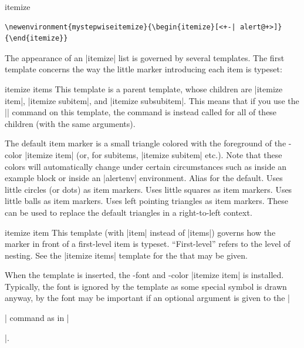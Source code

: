 \begin{environment}{{itemize}}
  \example
\begin{verbatim}
\newenvironment{mystepwiseitemize}{\begin{itemize}[<+-| alert@+>]}{\end{itemize}}
\end{verbatim}

  The appearance of an |itemize| list is governed by several templates. The first template concerns the way the little marker introducing each item is typeset:
  \begin{element}{itemize items}\semiyes\no\no
    This template is a parent template, whose children are |itemize item|, |itemize subitem|, and |itemize subsubitem|. This means that if you use the |\setbeamertemplate| command on this template, the command is instead called for all of these children (with the same arguments).

    \begin{templateoptions}
      The default item marker is a small triangle colored with the foreground of the \beamer-color |itemize item| (or, for subitems, |itemize subitem| etc.). Note that these colors will automatically change under certain circumstances such as inside an example block or inside an |alertenv| environment.
      Alias for the default.
      Uses little circles (or dots) as item markers.
      Uses little squares as item markers.
      Uses little balls as item markers.
      Uses left pointing triangles as item markers. These can be used to replace the default triangles in a right-to-left context.   
    \end{templateoptions}
  \end{element}

  \begin{element}{itemize item}\yes\yes\yes
    This template (with |item| instead of |items|) governs how the marker in front of a first-level item is typeset. ``First-level'' refers to the level of nesting. See the |itemize items| template for the  that may be given.

    When the template is inserted, the \beamer-font and -color |itemize item| is installed. Typically, the font is ignored by the template as some special symbol is drawn anyway, by the font may be important if an optional argument is given to the |\item| command as in |\item[First]|.


\end{element}
\end{environment}
